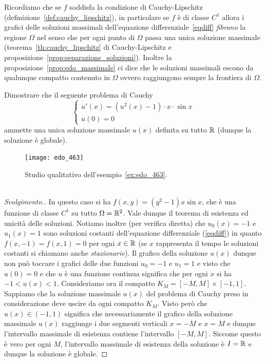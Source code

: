 Ricordiamo che se $f$ soddisfa la condizione di Cauchy-Lipschitz
(definizione~\ref{def:cauchy_lipschitz}), in particolare
se $f$ è di classe $C^1$ allora i grafici delle soluzioni
massimali dell'equazione differenziale~\eqref{eqdiff}
\emph{fibrano} la regione $\Omega$ nel senso che per ogni punto di
$\Omega$ passa una unica soluzione massimale (teorema~\ref{th:cauchy_lipschitz}
di Cauchy-Lipschitz e proposizione~\ref{prop:separazione_soluzioni}).
Inoltre la proposizione~\ref{prop:edo_massimale} ci dice
che le soluzioni massimali escono da qualunque compatto contenuto in
$\Omega$ ovvero raggiungono sempre la frontiera di $\Omega$.

\begin{example}\label{ex:edo_463}
Dimostrare che il seguente problema di Cauchy
\[
	\begin{cases}
		u'(x) = (u^2(x)-1)\cdot x\cdot \sin x \\
		u(0) = 0
	\end{cases}
\]
ammette una unica soluzione massimale $u(x)$
definita su tutto ${\mathbb R}$ (dunque la soluzione è globale).
\end{example}
\newsavebox{\qredoquattro}
\begin{figure}
  \centering\texttt{[image: edo\_463]}
  \caption{Studio qualitativo dell'esempio~\ref{ex:edo_463}.
  \ifwidemargin\\\\\fi%
  \usebox{\qredoquattro}}
  \label{fig:edo_463}
\end{figure}
%
\begin{proof}[Svolgimento.]
In questo caso si ha $f(x,y)=(y^2-1)x\sin x$, che \`e una funzione
di classe $C^1$ su tutto $\Omega={\mathbb R}^2$.
Vale dunque il teorema di esistenza ed
unicità delle soluzioni.
Notiamo inoltre (per verifica diretta)
che $u_0(x)=-1$ e $u_1(x)=1$ sono
soluzioni costanti dell'equazione differenziale (\ref{eqdiff})
in quanto $f(x,-1)=f(x,1)=0$ per ogni $x\in {\mathbb R}$
(se $x$ rappresenta il tempo le soluzioni costanti si chiamano
anche \emph{stazionarie}).
Il grafico della soluzione $u(x)$ dunque
non può toccare i grafici delle due funzioni $u_0=-1$ e $u_1=1$ e visto
che $u(0)=0$ e che $u$ è una funzione continua significa
che per ogni $x$ si ha $-1 < u(x) < 1$.
Consideriamo ora il compatto
$K_M=[-M,M] \times [-1,1]$.
Sappiamo che la soluzione
massimale $u(x)$ del problema di Cauchy preso in considerazione deve
uscire da ogni compatto $K_M$.
Visto però che $u(x)\in (-1,1)$ significa che necessariamente
il grafico della soluzione massimale $u(x)$
raggiunge i due segmenti verticali
$x=-M$ e $x=M$ e dunque l'intervallo massimale di esistenza
contiene l'intervallo $[-M,M]$.
Siccome questo è vero per ogni $M$, l'intervallo massimale
di esistenza della soluzione è $I={\mathbb R}$ e dunque la soluzione
è globale.
\end{proof}

